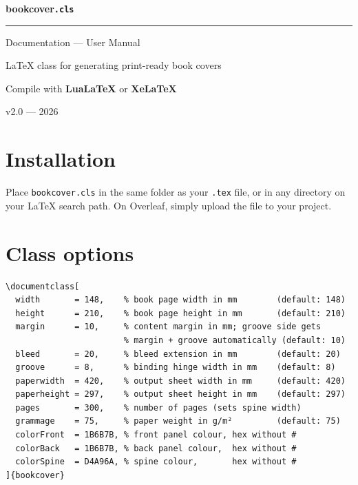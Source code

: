 \documentclass[12pt, a4paper]{article}
\begin{document}

\begin{titlepage}
  \centering
  \vspace*{3cm}
  {\fontsize{36}{40}\selectfont\bfseries\color{bcBlue}
    bookcover\texttt{.cls}\par}
  \vspace{0.5cm}
  {\color{bcGold}\rule{0.5\linewidth}{1.2pt}\par}
  \vspace{0.8cm}
  {\Large Documentation — User Manual\par}
  \vspace{0.4cm}
  {\normalsize \LaTeX{} class for generating print-ready book covers\par}
  \vfill
  {\small Compile with \textbf{Lua\LaTeX} or \textbf{Xe\LaTeX}\par}
  \vspace{1cm}
  {\small v2.0 — 2026\par}
\end{titlepage}

\tableofcontents
\newpage

\section{Installation}

Place \texttt{bookcover.cls} in the same folder as your \texttt{.tex} file,
or in any directory on your \LaTeX{} search path.
On Overleaf, simply upload the file to your project.

\section{Class options}

\begin{lstlisting}
\documentclass[
  width       = 148,    % book page width in mm        (default: 148)
  height      = 210,    % book page height in mm       (default: 210)
  margin      = 10,     % content margin in mm; groove side gets
                        % margin + groove automatically (default: 10)
  bleed       = 20,     % bleed extension in mm        (default: 20)
  groove      = 8,      % binding hinge width in mm    (default: 8)
  paperwidth  = 420,    % output sheet width in mm     (default: 420)
  paperheight = 297,    % output sheet height in mm    (default: 297)
  pages       = 300,    % number of pages (sets spine width)
  grammage    = 75,     % paper weight in g/m²         (default: 75)
  colorFront  = 1B6B7B, % front panel colour, hex without #
  colorBack   = 1B6B7B, % back panel colour,  hex without #
  colorSpine  = D4A96A, % spine colour,       hex without #
]{bookcover}
\end{lstlisting}
\end{document}
